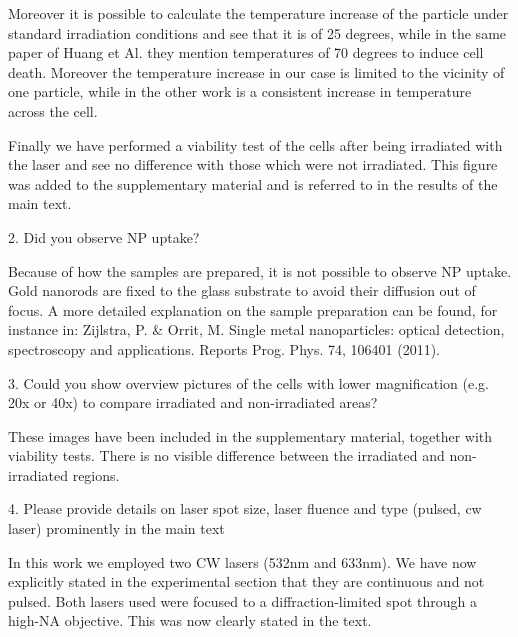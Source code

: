 Moreover it is possible to calculate the temperature increase of the particle
under standard irradiation conditions and see that it is of 25 degrees, while in
the same paper of Huang et Al. they mention temperatures of 70 degrees to induce
cell death. Moreover the temperature increase in our case is limited to the
vicinity of one particle, while in the other work is a consistent increase in
temperature across the cell. 

Finally we have performed a viability test of the cells after being irradiated
with the laser and see no difference with those which were not irradiated. This
figure was added to the supplementary material and is referred to in the
results of the main text.
 
2. Did you observe NP uptake?

Because of how the samples are prepared, it is not possible to observe NP
uptake. Gold nanorods are fixed to the glass substrate to avoid their diffusion
out of focus. A more detailed explanation on the sample preparation can be
found, for instance in:
 Zijlstra, P. & Orrit, M. Single metal nanoparticles:
optical detection, spectroscopy and applications. Reports Prog. Phys. 74, 106401
(2011).
 
3. Could you show overview pictures of the cells with lower magnification (e.g.
20x or 40x) to compare irradiated and non-irradiated areas?

These images have been included in the supplementary material, together with
viability tests. There is no visible difference between the irradiated and
non-irradiated regions.
 
4. Please provide details on laser spot size, laser fluence and type (pulsed, cw
laser) prominently in the main text 

In this work we employed two CW lasers (532nm and 633nm). We have now explicitly
stated in the experimental section that they are continuous and not pulsed. Both
lasers used were focused to a diffraction-limited spot through a high-NA
objective. This was now clearly stated in the text.
